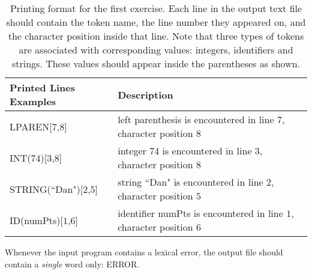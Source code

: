 \documentclass{article}
\begin{document}
\begin{table}[h]
\centering
\begin{tabular}{|l|l| }
Printed Lines Examples & Description \\
\hline
\hline
LPAREN[$7$,$8$] & left parenthesis is encountered in line $7$, character position $8$ \\
\hline
INT($74$)[$3$,$8$] & integer $74$ is encountered in line $3$, character position $8$ \\
\hline
STRING(``Dan")[$2$,$5$] & string ``Dan" is encountered in line $2$, character position $5$ \\
\hline
ID(numPts)[$1$,$6$] & identifier numPts is encountered in line $1$, character position $6$ \\
\hline
\end{tabular}
\caption{
Printing format for the first exercise.
Each line in the output text file should contain the token name,
the line number they appeared on, and the character position inside that line.
Note that three types of tokens are associated with corresponding values:
integers, identifiers and strings.
These values should appear inside the parentheses as shown.
\label{Table_Token_Printing_Examples_For_Exercise_1}}
\end{table}
Whenever the input program contains a lexical error, the output file
should contain a \textit{single} word only: ERROR.
\end{document}
